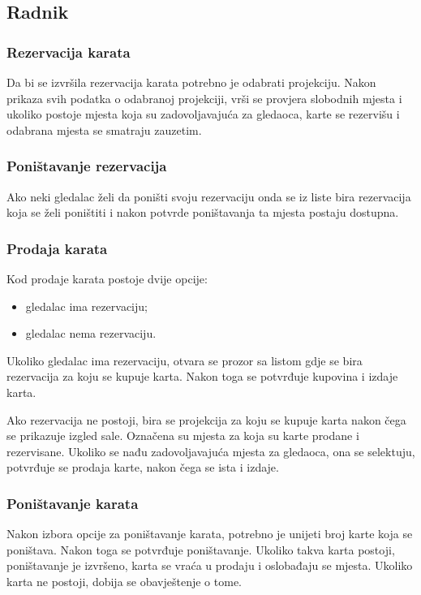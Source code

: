 \subsection{Radnik}
\subsubsection{Rezervacija karata}
Da bi se izvršila rezervacija karata potrebno je odabrati projekciju. Nakon prikaza svih podatka o odabranoj projekciji, 
vrši se provjera slobodnih mjesta i ukoliko postoje mjesta koja su zadovoljavajuća za gledaoca, karte se rezervišu 
i odabrana mjesta se smatraju zauzetim.

\subsubsection{Poništavanje rezervacija}
Ako neki gledalac želi da poništi svoju rezervaciju onda se iz liste bira rezervacija koja se želi poništiti i nakon potvrde poništavanja
ta mjesta postaju dostupna.

\subsubsection{Prodaja karata}
Kod prodaje karata postoje dvije opcije:
\begin{itemize}
\item gledalac ima rezervaciju;
\item gledalac nema rezervaciju.
\end{itemize}

Ukoliko gledalac ima rezervaciju, otvara se prozor sa listom gdje se bira rezervacija za koju se kupuje karta. Nakon toga se potvrđuje kupovina i izdaje karta.

Ako rezervacija ne postoji, bira se projekcija za koju se kupuje karta nakon čega se prikazuje izgled sale. Označena su mjesta za koja su karte prodane i rezervisane. Ukoliko se nađu zadovoljavajuća mjesta za gledaoca, ona se selektuju, potvrđuje se prodaja karte, nakon čega se ista i izdaje.

\subsubsection{Poništavanje karata}
Nakon izbora opcije za poništavanje karata, potrebno je unijeti broj karte koja se poništava. Nakon toga se potvrđuje poništavanje. Ukoliko takva karta postoji, poništavanje je izvršeno, karta se vraća u prodaju i oslobađaju se mjesta. Ukoliko karta ne postoji, dobija se obavještenje o tome.

